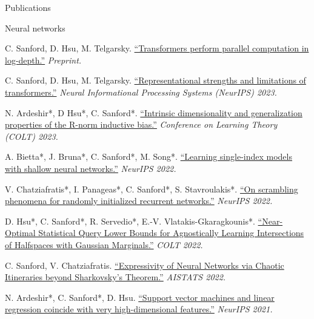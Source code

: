 \documentclass{resume} %
\begin{document}
\newpage
\begin{rSection}{Publications}
\begin{rSubsection}{Neural networks}{}{}{}{}

\item C. Sanford, D. Hsu, M. Telgarsky. \href{https://arxiv.org/abs/2402.09268}{``Transformers perform parallel computation in log-depth.''} \textit{Preprint.}

\item C. Sanford, D. Hsu, M. Telgarsky. \href{https://arxiv.org/abs/2306.02896}{``Representational strengths and limitations of transformers.''} \textit{Neural Informational Processing Systems (NeurIPS) 2023.}

\item N. Ardeshir*, D Hsu*, C. Sanford*. \href{https://proceedings.mlr.press/v195/ardeshir23a.html}{``Intrinsic dimensionality and generalization properties of the R-norm inductive bias.''} \textit{Conference on Learning Theory (COLT) 2023.}

\item A. Bietta*, J. Bruna*, C. Sanford*, M. Song*. \href{https://proceedings.neurips.cc/paper_files/paper/2022/hash/3fb6c52aeb11e09053c16eabee74dd7b-Abstract-Conference.html}{``Learning single-index models with shallow neural networks.''} \textit{NeurIPS 2022.}

\item V. Chatziafratis*, I. Panageas*, C. Sanford*, S. Stavroulakis*. \href{https://proceedings.neurips.cc/paper_files/paper/2022/hash/755acd0c7c07180d78959b6d89768207-Abstract-Conference.html}{``On scrambling phenomena for randomly initialized recurrent networks.''} \textit{NeurIPS 2022.}

\item D. Hsu*, C. Sanford*, R. Servedio*, E.-V. Vlatakis-Gkaragkounis*. \href{https://proceedings.mlr.press/v178/hsu22a.html}{``Near-Optimal Statistical Query Lower Bounds for Agnostically Learning Intersections of Halfspaces with Gaussian Marginals.''} \textit{COLT 2022.}

\item C. Sanford, V. Chatziafratis. \href{https://proceedings.mlr.press/v151/sanford22a.html}{``Expressivity of Neural Networks via Chaotic Itineraries beyond Sharkovsky's Theorem.''} \textit{AISTATS 2022.}

\item N. Ardeshir*, C. Sanford*, D. Hsu. \href{https://proceedings.neurips.cc/paper/2021/hash/26d4b4313a7e5828856bc0791fca39a2-Abstract.html}{``Support vector machines and linear regression coincide with very high-dimensional features.''} \textit{NeurIPS 2021.}


\end{rSubsection}
\end{rSection}
\end{document}
